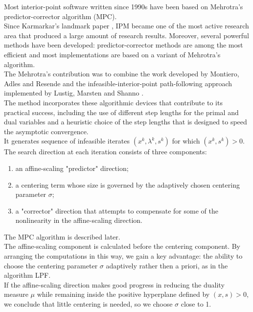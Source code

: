 \documentclass[a4paper,10 pt,titlepage,twoside]{book}
\theoremstyle{plain}
\theoremstyle{definition}
\theoremstyle{remark}
\begin{document}
Most interior-point software written since 1990s have been based on Mehrotra's predictor-corrector algorithm (MPC).\\
Since Karmarkar's landmark paper \cite{Kar}, IPM became one of the most active research area that produced a large amount of research results. Moreover, several powerful methods have been developed: predictor-corrector methods are among the most efficient and most implementations are based on a variant of Mehrotra's algorithm. \\
The Mehrotra's contribution was to combine the work developed by Montiero, Adles and Resende \cite{MARE} and the infeasible-interior-point path-following approach implemented by Lustig, Marsten and Shanno \cite{LMS}.\\ 
The method incorporates these algorithmic devices that contribute to its practical success, including the use of different step lengths for the primal and dual variables and a heuristic choice of the step lengths that is designed to speed the asymptotic convergence.\\
It generates sequence of infeasible iterates $(x^{k},\lambda^{k},s^{k})$ for which $(x^{k},s^{k})>0$. The search direction at each iteration consists of three components:
\begin{enumerate}
	\item an affine-scaling "predictor" direction;
	\item a centering term whose size is governed by the adaptively chosen centering parameter $\sigma$;
	\item a "corrector" direction that attempts to compensate for some of the nonlinearity in the affine-scaling direction.
	\end{enumerate}
The MPC algorithm is described later. \\
The affine-scaling component is calculated before the centering component. By arranging the computations in this way, we gain a key advantage: the ability to choose the centering parameter $\sigma$ adaptively rather then a priori, as in the algorithm LPF.\\
If the affine-scaling direction makes good progress in reducing the duality measure $\mu$ while remaining inside the positive hyperplane defined by $(x,s)>0$, we conclude that little centering is needed, so we choose $\sigma$ close to 1.
\end{document}
